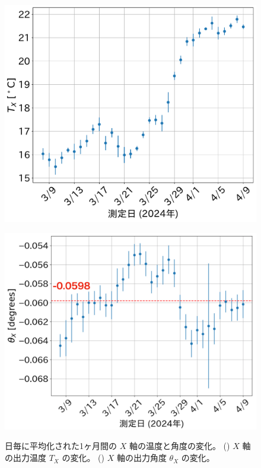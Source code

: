 \documentclass[../../main.tex]{subfiles}
\begin{document}
\begin{figure}[H]
    \begin{minipage}[b]{0.45\columnwidth}
        \centering
        \includegraphics[width=1.0\columnwidth]{tiltsensor/timedrift_tempX_daily.pdf}
        \subcaption{}
        \label{fig:timedrift_tempX}
    \end{minipage}
    \hspace{2mm}
    \begin{minipage}[b]{0.527\columnwidth}
        \centering
        \includegraphics[width=0.95\columnwidth]{tiltsensor/timedrift_angleX_daily.pdf}
        \subcaption{}
        \label{fig:timedrift_angleX}
    \end{minipage}
    \caption{日毎に平均化された1ヶ月間の $X$ 軸の温度と角度の変化。
             () $X$ 軸の出力温度 $T_{X}$ の変化。
             () $X$ 軸の出力角度 $\theta_{X}$ の変化。}
    \label{fig:timedrift_Xaxis}
\end{figure}
\end{document}
